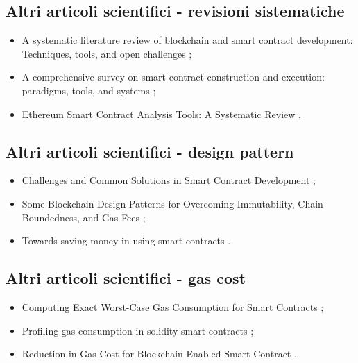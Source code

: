 \subsection*{Altri articoli scientifici - revisioni sistematiche}
\begin{itemize}

\item A systematic literature review of blockchain and smart contract development: Techniques, tools, and open challenges \cite{vacca2021literature};

\item A comprehensive survey on smart contract construction and execution: paradigms, tools, and systems \cite{hu2021survey};

\item Ethereum Smart Contract Analysis Tools: A Systematic Review \cite{kushwaha2022tools}.

\end{itemize}

\subsection*{Altri articoli scientifici - design pattern}
\begin{itemize}

\item Challenges and Common Solutions in Smart Contract Development \cite{kannengiesser2022challanges};

\item Some Blockchain Design Patterns for Overcoming Immutability, Chain-Boundedness, and Gas Fees \cite{mandarino2022patterns};

\item Towards saving money in using smart contracts \cite{chen2018gas}.

\end{itemize}

\subsection*{Altri articoli scientifici - gas cost}
\begin{itemize}

\item Computing Exact Worst-Case Gas Consumption for Smart Contracts \cite{marescotti2018gascost};

\item Profiling gas consumption in solidity smart contracts \cite{disorbo2022gascost};

\item Reduction in Gas Cost for Blockchain Enabled Smart Contract \cite{masla2021gascost}.

\end{itemize}

